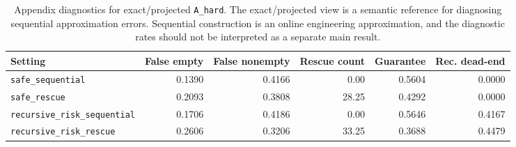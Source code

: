 \begin{table}[t]
\centering
\caption{Appendix diagnostics for exact/projected \texttt{A\_hard}. The exact/projected view is a semantic reference for diagnosing sequential approximation errors. Sequential construction is an online engineering approximation, and the diagnostic rates should not be interpreted as a separate main result.}
\label{tab:appendix-exact-hard}
\small
\begin{tabular}{lrrrrr}
\toprule
Setting & False empty & False nonempty & Rescue count & Guarantee & Rec. dead-end \\
\midrule
\texttt{safe\_sequential} & 0.1390 & 0.4166 & 0.00 & 0.5604 & 0.0000 \\
\texttt{safe\_rescue} & 0.2093 & 0.3808 & 28.25 & 0.4292 & 0.0000 \\
\texttt{recursive\_risk\_sequential} & 0.1706 & 0.4186 & 0.00 & 0.5646 & 0.4167 \\
\texttt{recursive\_risk\_rescue} & 0.2606 & 0.3206 & 33.25 & 0.3688 & 0.4479 \\
\bottomrule
\end{tabular}
\end{table}
